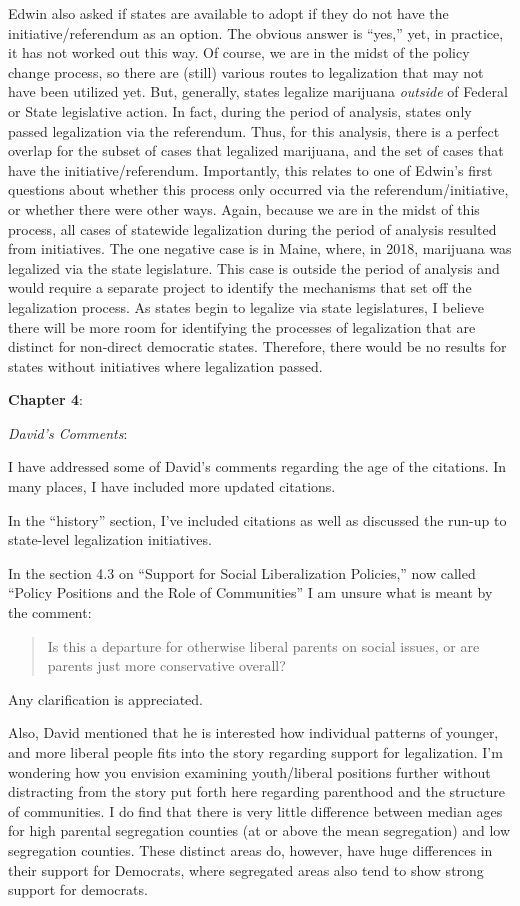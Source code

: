 \documentclass[12pt,stdletter,dateno,sigleft]{newlfm} %
\begin{document}
\begin{newlfm}
Edwin also asked if states are available to adopt if they do not have the initiative/referendum as an option. The obvious answer is ``yes,'' yet, in practice, it has not worked out this way. Of course, we are in the midst of the policy change process, so there are (still) various routes to legalization that may not have been utilized yet. But, generally, states legalize marijuana \textit{outside} of Federal or State legislative action. In fact, during the period of analysis, states only passed legalization via the referendum. Thus, for this analysis, there is a perfect overlap for the subset of cases that legalized marijuana, and the set of cases that have the initiative/referendum. Importantly, this relates to one of Edwin's first questions about whether this process only occurred via the referendum/initiative, or whether there were other ways. Again, because we are in the midst of this process, all cases of statewide legalization during the period of analysis resulted from initiatives. The one negative case is in Maine, where, in 2018, marijuana was legalized via the state legislature. This case is outside the period of analysis and would require a separate project to identify the mechanisms that set off the legalization process. As states begin to legalize via state legislatures, I believe there will be more room for identifying the processes of legalization that are distinct for non-direct democratic states. Therefore, there would be no results for states without initiatives where legalization passed.\newline


\textbf{Chapter 4}: 

\textit{David's Comments}:

I have addressed some of David's comments regarding the age of the citations. In many places, I have included more updated citations. 

In the ``history'' section, I've included citations as well as discussed the run-up to state-level legalization initiatives. 

In the section 4.3 on ``Support for Social Liberalization Policies,'' now called ``Policy Positions and the Role of Communities'' I am unsure what is meant by the comment:
\begin{quote}
Is this a departure for otherwise liberal parents on social issues, or are parents just more conservative overall?
\end{quote}
Any clarification is appreciated.

Also, David mentioned that he is interested how individual patterns of younger, and more liberal people fits into the story regarding support for legalization. I'm wondering how you envision examining youth/liberal positions further without distracting from the story put forth here regarding parenthood and the structure of communities. I do find that there is very little difference between median ages for high parental segregation counties (at or above the mean segregation) and low segregation counties. These distinct areas do, however, have huge differences in their support for Democrats, where segregated areas also tend to show strong support for democrats.


\end{newlfm}
\end{document}
